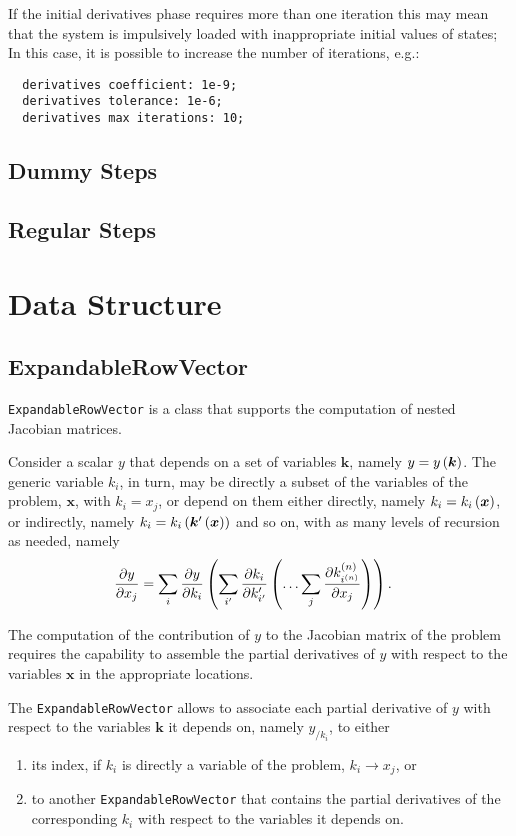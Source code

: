 \documentclass[10pt,dvips,fleqn,subeqn]{report}
\newcommand{\T}[1]{\bm{#1}}
\begin{document}
\noindent
If the initial derivatives phase requires
more than one iteration  
this may mean that
the system is impulsively loaded  with inappropriate 
initial values of states; 
In this case, it is possible to increase the number of iterations, e.g.:
\begin{verbatim}
  derivatives coefficient: 1e-9;
  derivatives tolerance: 1e-6;
  derivatives max iterations: 10; 
\end{verbatim}
\section{Dummy Steps}
\section{Regular Steps}




\chapter{Data Structure}


\section{ExpandableRowVector}
\texttt{ExpandableRowVector} is a class that supports
the computation of nested Jacobian matrices.

Consider a scalar $y$  that depends on a set of variables $\T{k}$,
namely $y=y\plbr{\T{k}}$.
The generic variable $k_i$, in turn, may be directly a subset of the variables
of the problem, $\T{x}$, with $k_i=x_j$, or depend on them either directly,
namely $k_i=k_i\plbr{\T{x}}$, or indirectly,
namely $k_i=k_i\plbr{\T{k}'\plbr{\T{x}}}$ and so on,
with as many levels of recursion as needed, namely
\begin{align}
	\frac{\partial y}{\partial x_j}
	&=
	\sum_{i} \frac{\partial y}{\partial k_i}\left( 
		\sum_{i'} \frac{\partial k_i}{\partial k'_{i'}}\left( 
			\ldots
			\sum_{j} \frac{\partial k^{(n)}_{i^{(n)}}}{\partial x_j}
		 \right)
	 \right)
	.
\end{align}

The computation of the contribution of $y$ to the Jacobian matrix
of the problem requires the capability to assemble the partial derivatives
of $y$ with respect to the variables $\T{x}$ in the appropriate locations.

The \texttt{ExpandableRowVector} allows to associate each partial derivative
of $y$ with respect to the variables $\T{k}$ it depends on, namely $y_{/k_i}$,
to either 
\begin{enumerate}
\renewcommand{\labelenumi}{\alph{enumi})}
\item its index, if $k_i$ is directly a variable of the problem,
$k_i\rightarrow x_j$, or
\item to another \texttt{ExpandableRowVector} that contains
the partial derivatives of the corresponding $k_i$ with respect
to the variables it depends on.
\end{enumerate}
\end{document}
